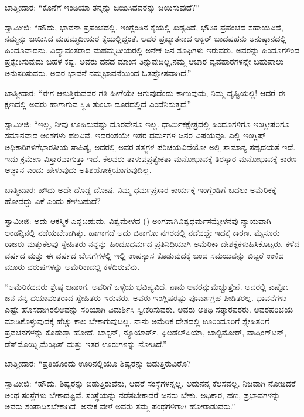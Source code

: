 ಬಾತ್ಮೀದಾರ: “ಕೊನೆಗೆ ಇಂಡಿಯಾ ತನ್ನನ್ನು ಜಯಿಸಿದವರನ್ನು ಜಯಿಸುವುದೆ?”

ಸ್ವಾಮೀಜಿ: “ಹೌದು, ಭಾವನಾ ಪ್ರಪಂಚದಲ್ಲಿ. ಇಂಗ್ಲೆಂಡಿನ ಕೈಯಲ್ಲಿ ಖಡ್ಗವಿದೆ, ಭೌತಿಕ ಪ್ರಪಂಚದ ಸಹಾಯವಿದೆ, ನಮ್ಮನ್ನು ಜಯಿಸಿದ ಮಹಮ್ಮದೀಯರ ಕೈಯಲ್ಲಿ\-ದ್ದಂತೆ. ಆದರೆ ಪ್ರಖ್ಯಾತನಾದ ಅಕ್ಬರ್​ ಬಾದಷಹನು ಅನುಷ್ಠಾನದಲ್ಲಿ ಹಿಂದೂವಾದನು. ವಿದ್ಯಾವಂತರಾದ ಮಹಮ್ಮದೀಯರಲ್ಲಿ ಅನೇಕ ಜನ ಸೂಫಿಗಳು ಇರುವರು. ಅವರನ್ನು ಹಿಂದೂಗಳಿಂದ ಪ್ರತ್ಯೇಕಿಸುವುದು ಬಹಳ ಕಷ್ಟ. ಅವರು ದನದ ಮಾಂಸ ತಿನ್ನುವುದಿಲ್ಲ,\break ನಮ್ಮ ಆಚಾರ ವ್ಯವಹಾರಗಳನ್ನೇ ಬಹುಪಾಲು ಅನುಸರಿಸುವರು. ಅವರ ಭಾವನೆ ನಮ್ಮ\break ಭಾವನೆಯಿಂದ ಓತಪ್ರೋತವಾಗಿದೆ.”

ಬಾತ್ಮೀದಾರ: “ಈಗ ಆಳುತ್ತಿರುವವರ ಗತಿ ಹೀಗೆಯೇ ಆಗುವುದೆಂದು ಕಾಣುವುದು, ನಿಮ್ಮ ದೃಷ್ಟಿಯಲ್ಲಿ! ಆದರೆ ಈ ಕ್ಷಣದಲ್ಲಿ ಅವರು ಹಾಗಾಗುವ ಸ್ಥಿತಿ ತುಂಬಾ ದೂರದಲ್ಲಿದೆ ಎಂದೆನಿಸುತ್ತದೆ.”

ಸ್ವಾಮೀಜಿ: “ಇಲ್ಲ, ನೀವು ಊಹಿಸುವಷ್ಟು ದೂರವೇನೂ ಇಲ್ಲ. ಧಾರ್ಮಿಕ\break ಕ್ಷೇತ್ರದಲ್ಲಿ ಹಿಂದೂಗಳಿಗೂ ಇಂಗ್ಲೀಷರಿಗೂ ಸಮಾನವಾದ ಅಂಶಗಳು ಹಲವಿವೆ. ಇದರಂತೆಯೇ ಇತರ ಧರ್ಮಗಳ ಜನರ ವಿಷಯವೂ. ಎಲ್ಲಿ ಇಂಗ್ಲಿಷ್​ ಅಧಿಕಾರಿಗಳಿಗೆ\break ಭಾರತೀಯ ಸಾಹಿತ್ಯ, ಅದರಲ್ಲಿ ಅವರ ತತ್ತ್ವಗಳ ಪರಿಚಯವಿದೆಯೋ ಅಲ್ಲಿ ಸಾಮಾನ್ಯ ಸಹೃದಯತೆ ಇದೆ. ಇದು ಕ್ರಮೇಣ ವಿಸ್ತಾರವಾಗುತ್ತಾ ಇದೆ. ಕೆಲವರು ತಾಳುವ\break ಪ್ರತ್ಯೇಕತಾ ಮನೋಭಾವಕ್ಕೆ ತಿರಸ್ಕಾರ ಮನೋಭಾವಕ್ಕೆ ಕಾರಣ ಅಜ್ಞಾನ ಎಂದು ಹೇಳುವುದು ಅತಿಶಯೋಕ್ತಿಯಾಗುವುದಿಲ್ಲ.

ಬಾತ್ಮೀದಾರ: ಹೌದು ಅದೇ ದೊಡ್ಡ ದೋಷ. ನಿಮ್ಮ ಧರ್ಮಪ್ರಸಾರ ಕಾರ್ಯಕ್ಕೆ ಇಂಗ್ಲೆಂಡಿಗೆ ಬದಲು ಅಮೆರಿಕಕ್ಕೆ ಹೋದದ್ದು ಏಕೆ ಎಂದು ಕೇಳಬಹುದೆ?

ಸ್ವಾಮೀಜಿ: ಅದು ಆಕಸ್ಮಿಕ ಎನ್ನಬಹುದು. ವಿಶ್ವಮೇಳದ () ಅಂಗವಾಗಿ\break ವಿಶ್ವಧರ್ಮಸಮ್ಮೇಳನವು ನ್ಯಾಯವಾಗಿ ಲಂಡನ್ನಿನಲ್ಲಿ ನಡೆಯಬೇಕಾಗಿತ್ತು. ಹಾಗಾಗದೆ ಅದು ಚಿಕಾಗೋ ನಗರದಲ್ಲಿ ನಡೆದದ್ದೇ ಇದಕ್ಕೆ ಕಾರಣ. ಮೈಸೂರು ರಾಜರು ಮತ್ತು\break ಕೆಲವು ಸ್ನೇಹಿತರು ನನ್ನನ್ನು ಹಿಂದೂಧರ್ಮದ ಪ್ರತಿನಿಧಿಯಾಗಿ ಅಮೆರಿಕಾ ದೇಶಕ್ಕೆ\break ಕಳುಹಿಸಿಕೊಟ್ಟರು. ಕಳೆದ ವರ್ಷದ ಮತ್ತು ಈ ವರ್ಷದ ಬೇಸಗೆಗಳಲ್ಲಿ ಇಲ್ಲಿ ಉಪನ್ಯಾಸ ಕೊಡುವುದಕ್ಕೆ ಬಂದ ಸಮಯವನ್ನು ಬಿಟ್ಟರೆ ಉಳಿದ ಮೂರು ವರುಷಗಳನ್ನು ಅಮೆರಿಕಾದಲ್ಲಿ ಕಳೆದಿರುವೆನು.

“ಅಮೆರಿಕದವರು ಶ್ರೇಷ್ಠ ಜನಾಂಗ. ಅವರಿಗೆ ಒಳ್ಳೆಯ ಭವಿಷ್ಯವಿದೆ. ನಾನು ಅವರನ್ನು\break ಮೆಚ್ಚುತ್ತೇನೆ. ಅವರಲ್ಲಿ ಎಷ್ಟೋ ಜನ ನನ್ನ ದಯಾವಂತರಾದ ಸ್ನೇಹಿತರು ಇರುವರು. ಅವರು ಇಂಗ್ಲಿಷರಷ್ಟು ಪೂರ್ವಾಗ್ರಹ ಪೀಡಿತರಲ್ಲ. ಭಾವನೆಗಳು ಎಷ್ಟೇ ಹೊಸದಾಗಿರಲಿ\break ಅವನ್ನು ಸರಿಯಾಗಿ ವಿಮರ್ಶಿಸಿ ಸ್ವೀಕರಿಸುವರು. ಅವರು ಅತಿಥಿ ಸತ್ಕಾರಪರರು. ಅವರ\break ಪರಿಚಯ ಮಾಡಿಕೊಳ್ಳುವುದಕ್ಕೆ ಹೆಚ್ಚು ಕಾಲ ಬೇಕಾಗುವುದಿಲ್ಲ. ನಾನು ಅಮೆರಿಕ ದೇಶದಲ್ಲಿ ಊರಿಂದೂರಿಗೆ ಸ್ನೇಹಿತರಿಗೆ ಪ್ರವಚನಗಳನ್ನು ಕೊಡುತ್ತಾ ಹೋದೆ. ಬಾಸ್ಟನ್​, ನ್ಯೂಯಾರ್ಕ್​, ಫಿಲಡೆಲ್​ಪಿಯಾ, ಬಾಲ್ಟಿಮೋರ್​, ವಾಷಿಂಗ್​ಟನ್​, ಡೆಸ್​ಮೊಯ್ನಿ,\break ಮೆಂಫಿಸ್​ ಮತ್ತು ಇತರ ಊರುಗಳನ್ನು ನೋಡಿದೆ.”

ಬಾತ್ಮೀದಾರ: “ಪ್ರತಿಯೊಂದು ಊರಿನಲ್ಲಿಯೂ ಶಿಷ್ಯರನ್ನು ಬಿಡುತ್ತಿರುವಿರೊ?

ಸ್ವಾಮೀಜಿ: “ಹೌದು, ಶಿಷ್ಯರನ್ನು ಬಿಡುತ್ತಿರುವೆನು, ಆದರೆ ಸಂಸ್ಥೆಗಳನ್ನಲ್ಲ. ಅದು\break ನನ್ನ ಕೆಲಸವಲ್ಲ. ನಿಜವಾಗಿ ನೋಡಿದರೆ ಅಂಥ ಸಂಸ್ಥೆಗಳು ಬೇಕಾದಷ್ಟಿವೆ. ಸಂಸ್ಥೆಯನ್ನು ನಡೆಸಬೇಕಾದರೆ ಜನರು ಬೇಕು. ಅಧಿಕಾರ, ಹಣ, ಪ್ರಭಾವಗಳನ್ನು ಅವರು ಸಂಪಾದಿಸಬೇಕಾಗಿದೆ. ಅನೇಕ ವೇಳೆ ಅವರು ತಮ್ಮ ಪಂಥಗಳಿಗಾಗಿ ಹೋರಾಡುವರು.”

